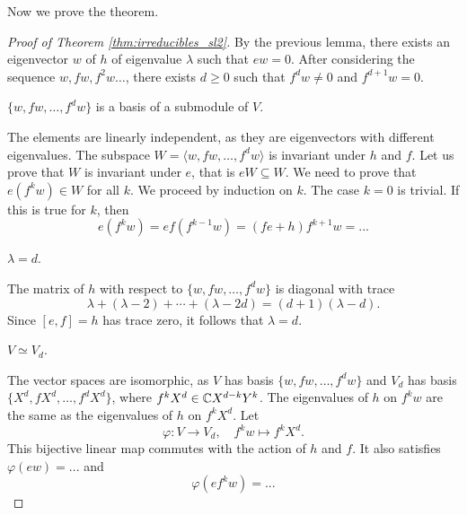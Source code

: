 Now we prove the theorem.

\begin{proof}[Proof of Theorem \ref{thm:irreducibles_sl2}]
    By the previous lemma, there exists an eigenvector $w$ 
    of $h$ of eigenvalue $\lambda$ such that $ew=0$. After considering
    the sequence $w,fw,f^2w\dots$, there exists $d\geq0$ such that 
    $f^dw\ne 0$ and $f^{d+1}w=0$. 
    
    \begin{claim}
        $\{w,fw,\dots,f^dw\}$ is a basis of a submodule of $V$.
    \end{claim}
    
    The elements are linearly independent, as they are eigenvectors with 
    different eigenvalues. The subspace $W=\langle w,fw,\dots,f^dw\rangle$ 
    is invariant under $h$ and $f$. Let us prove that $W$ is invariant 
    under $e$, that is $eW\subseteq W$. We need to prove that
    $e(f^kw)\in W$ for all $k$. We proceed by induction on $k$. 
    The case $k=0$ is trivial. 
    If this is true for $k$, then 
    \[
    e(f^kw)=ef(f^{k-1}w)=(fe+h)f^{k+1}w=...
    \]
    
    \begin{claim}
        $\lambda=d$. 
    \end{claim}
    
    The matrix of $h$ with respect to $\{w,fw,\dots,f^dw\}$ 
    is diagonal with trace 
    \[
    \lambda+(\lambda-2)+\cdots+(\lambda-2d)=(d+1)(\lambda-d).
    \]
    Since $[e,f]=h$ has trace zero, it follows that $\lambda=d$. 
    
    \begin{claim}
        $V\simeq V_d$.
    \end{claim}
    
    The vector spaces are isomorphic, as $V$ has basis $\{w,fw,\dots,f^dw\}$ and 
    $V_d$ has basis $\{X^d,fX^d,\dots,f^dX^d\}$, where
    $f^kX^d\in\mathbb{C} X^{d-k}Y^k$. The eigenvalues of $h$ on $f^kw$ 
    are the same as the eigenvalues of $h$ on $f^kX^d$. Let 
    \[
    \varphi\colon V\to V_d,\quad
    f^kw\mapsto f^kX^d.
    \]
    This bijective linear map commutes with the action of $h$ and $f$. 
    It also satisfies $\varphi(ew)=...$
    and 
    \[
    \varphi(ef^kw)=...
    \]
\end{proof}

\begin{corollary}

\end{corollary}


